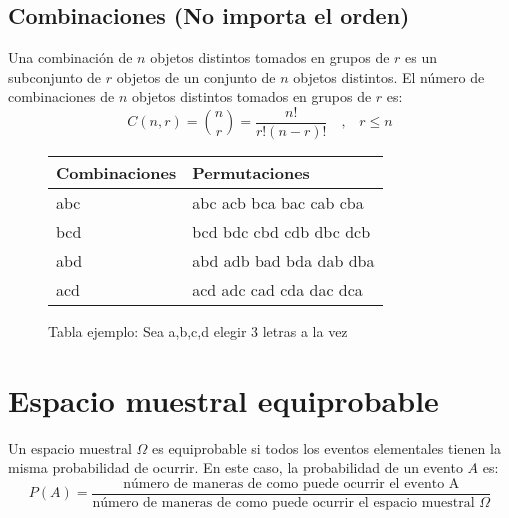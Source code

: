 \documentclass{templateNote}
\begin{document}
\subsection{Combinaciones (No importa el orden)}
\indent
Una combinación de $n$ objetos distintos tomados en grupos de $r$ es un subconjunto de $r$ objetos de un conjunto de $n$ objetos distintos. El número de combinaciones de $n$ objetos distintos tomados en grupos de $r$ es:
\begin{equation*}
    C(n, r) = \binom{n}{r} = \frac{n!}{r!(n - r)!} \quad \text{,} \quad r \leq n
\end{equation*}

\begin{figure}[H]
    \centering
    \begin{tabularx}{\textwidth}{|L|L|}
        \hline
        \textbf{Combinaciones} & \textbf{Permutaciones} \\
        \hline
        abc & abc acb bca bac cab cba \\
        bcd & bcd bdc cbd cdb dbc dcb \\
        abd & abd adb bad bda dab dba \\
        acd & acd adc cad cda dac dca \\
        \hline
    \end{tabularx}
    \caption{Tabla ejemplo: Sea a,b,c,d elegir 3 letras a la vez}
\end{figure}

\section{Espacio muestral equiprobable}
\indent
Un espacio muestral $\Omega$ es equiprobable si todos los eventos elementales tienen la misma probabilidad de ocurrir. En este caso, la probabilidad de un evento $A$ es:
\begin{equation*}
    P(A) = \frac{\text{número de maneras de como puede ocurrir el evento A}}{\text{número de maneras de como puede ocurrir el espacio muestral } \Omega}
\end{equation*}

\newpage
\end{document}
